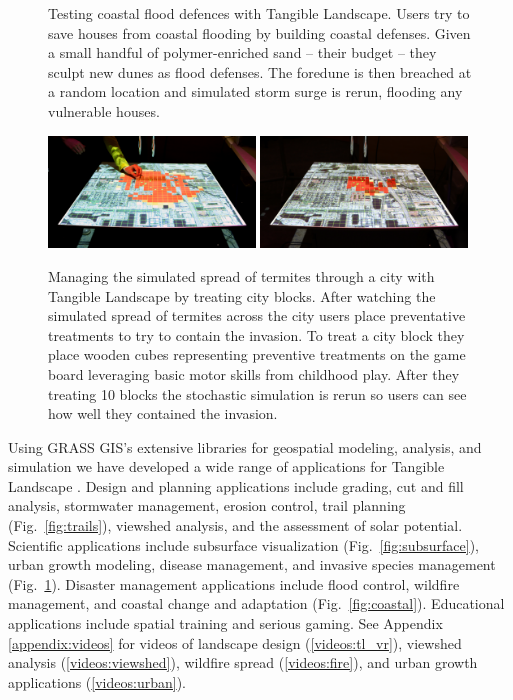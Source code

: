 \documentclass[prodmode,acmtochi]{acmsmall} %
\begin{document}
\begin{figure}
\begin{center}
	\caption{Testing coastal flood defences with Tangible Landscape. Users try to save houses from coastal flooding by building coastal defenses. Given a small handful of polymer-enriched sand -- their budget -- they sculpt new dunes as flood defenses. The foredune is then breached at a random location and simulated storm surge is rerun, flooding any vulnerable houses.}
	\label{fig:coastal}
\end{center}
%
\begin{center}
		\includegraphics[width=0.49\textwidth]{images/applications/termite_game_2.jpg}
		\includegraphics[width=0.49\textwidth]{images/applications/termite_game_3.jpg}
	\caption{Managing the simulated spread of termites through a city with Tangible Landscape by treating city blocks. After watching the simulated spread of termites across the city users place preventative treatments to try to contain the invasion. To treat a city block they place wooden cubes representing preventive treatments on the game board leveraging basic motor skills from childhood play. After they treating 10 blocks the stochastic simulation is rerun so users can see how well they contained the invasion.}
	\label{fig:termites}
\end{center}
%
\end{figure}

Using GRASS GIS's extensive libraries for 
geospatial modeling, analysis, and simulation 
we have developed a wide range of applications for Tangible Landscape 
\cite{Petrasova2015}.
Design and planning applications include
grading, cut and fill analysis, stormwater management, erosion control, 
trail planning (Fig.~\ref{fig:trails}), viewshed analysis, and the assessment of solar potential. 
Scientific applications include
subsurface visualization (Fig.~\ref{fig:subsurface}), urban growth modeling, disease management, and invasive species management (Fig.~\ref{fig:termites}).
Disaster management applications include 
flood control, wildfire management, and coastal change and adaptation (Fig.~\ref{fig:coastal}). 
Educational applications include
spatial training and serious gaming.
%
See Appendix \ref{appendix:videos}
for videos of landscape design (\ref{videos:tl_vr}), viewshed analysis (\ref{videos:viewshed}), wildfire spread (\ref{videos:fire}), and urban growth applications (\ref{videos:urban}).
\end{document}
